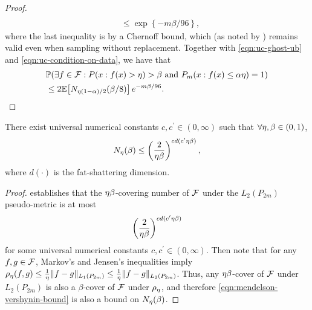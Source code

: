 \begin{proof}
\begin{align*}
\\ & \leq \exp\!\left\{ - m \beta / 96 \right\},
\end{align*}
where the last inequality is by a Chernoff bound, which (as noted by \citet*{hoeffding}) remains valid even when sampling without replacement.
Together with \eqref{eqn:uc-ghost-ub} and \eqref{eqn:uc-condition-on-data}, we have that
\begin{align*}
& \mathbb{P}\!\left( \exists f \in \mathcal{F} : P( x : f(x) > \eta ) > \beta \text{ and } P_{m}( x : f(x) \leq \alpha \eta ) =1 \right) 
\\ & \leq 2 \mathbb{E}\!\left[ N_{\eta (1-\alpha)/2}(\beta/8) \right] e^{- m \beta / 96}.
\end{align*}
\end{proof}


\begin{lemma}
\label{lem:eps-gam-covering-numbers}
There exist universal numerical constants $c,c^{\prime} \in (0,\infty)$ such that $\forall \eta,\beta \in (0,1)$,  
\begin{equation*}
N_{\eta}(\beta) \leq \left(\frac{2}{\eta\beta}\right)^{c d(c^{\prime} \eta \beta)},
\end{equation*}
where $d(\cdot)$ is the fat-shattering dimension.
\end{lemma}
\begin{proof}
   \citet[Theorem 1]{MR1965359} establishes that 
the $\eta\beta$-covering number of $\mathcal{F}$ under the $L_{2}(P_{2m})$ pseudo-metric 
is at most 
\begin{equation}
\label{eqn:mendelson-vershynin-bound}
\left(\frac{2}{\dev\beta}\right)^{c d(c^{\prime} \dev \beta)}
\end{equation}
for some universal numerical constants $c,c^{\prime} \in (0,\infty)$.
Then note that for any $f,g \in \mathcal{F}$, Markov's
and Jensen's inequalities imply
$\rho_{\eta}(f,g) \leq \frac{1}{\eta} \| f - g \|_{L_{1}(P_{2m})} \leq \frac{1}{\eta} \| f - g \|_{L_{2}(P_{2m})}$.
Thus, any $\eta\beta$-cover of $\mathcal{F}$ under $L_{2}(P_{2m})$ is also a $\beta$-cover of $\mathcal{F}$ under $\rho_{\eta}$,
and therefore \eqref{eqn:mendelson-vershynin-bound} is also a bound on $N_{\eta}(\beta)$.
\end{proof}


